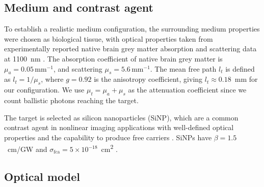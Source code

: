 \documentclass{optica-article}
\begin{document}
\subsection{Medium and contrast agent}

To establish a realistic medium configuration, the surrounding medium properties were chosen as biological tissue, with optical properties taken from experimentally reported native brain grey matter absorption and scattering data at 1100~nm \cite{yaroslavsky2002}. The absorption coefficient of native brain grey matter is $\mu_a = 0.05\,\mathrm{mm}^{-1}$, and scattering $\mu_s = 5.6\,\mathrm{mm}^{-1}$. The mean free path $l_t$ is defined as $l_t = 1/\mu_s$, where $g = 0.92$ is the anisotropy coefficient, giving $l_t \approx 0.18$~mm for our configuration. We use $\mu_t = \mu_a + \mu_s$ as the attenuation coefficient since we count ballistic photons reaching the target.

The target is selected as silicon nanoparticles (SiNP), which are a common contrast agent in nonlinear imaging applications with well-defined optical properties and the capability to produce free carriers \cite{boggess1986, trinh2012}. SiNPs have $\beta = 1.5$~\si{cm/GW} and $\sigma_\text{fca} = 5\times10^{-18}$~\si{cm^2} \cite{boggess1986}.

\subsection{Optical model}
\end{document}
